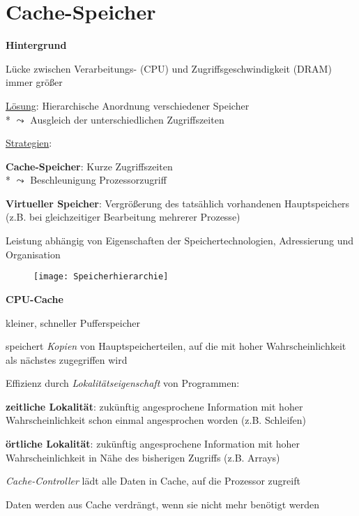 \section{Cache-Speicher}

\textbf{Hintergrund}
\begin{items}
	\item Lücke zwischen Verarbeitungs- (CPU) und Zugriffsgeschwindigkeit (DRAM) immer größer
	\item \underline{Lösung}: Hierarchische Anordnung verschiedener Speicher \\*
		\( \leadsto \) Ausgleich der unterschiedlichen Zugriffszeiten
	\item \underline{Strategien}:
	\begin{enumeration}
		\item \textbf{Cache-Speicher}: Kurze Zugriffszeiten \\*
			\( \leadsto \) Beschleunigung Prozessorzugriff
		\item \textbf{Virtueller Speicher}: Vergrößerung des tatsählich vorhandenen Hauptspeichers (z.B. bei gleichzeitiger Bearbeitung mehrerer Prozesse)
	\end{enumeration}
	\item Leistung abhängig von Eigenschaften der Speichertechnologien, Adressierung und Organisation
\end{items}
\begin{figure}[H]\centering\label{Speicherhierarchie}\texttt{[image: Speicherhierarchie]}\end{figure}

\newpage

\textbf{CPU-Cache}
\begin{items}
	\item kleiner, schneller Pufferspeicher
	\item speichert \emph{Kopien} von Hauptspeicherteilen, auf die mit hoher Wahrscheinlichkeit als nächstes zugegriffen wird
	\item Effizienz durch \emph{Lokalitätseigenschaft} von Programmen:
	\begin{enumeration}
		\item \textbf{zeitliche Lokalität}: zukünftig angesprochene Information mit hoher Wahrscheinlichkeit schon einmal angesprochen worden (z.B. Schleifen)
		\item \textbf{örtliche Lokalität}: zukünftig angesprochene Information mit hoher Wahrscheinlichkeit in Nähe des bisherigen Zugriffs (z.B. Arrays)
	\end{enumeration}
	\item \emph{Cache-Controller} lädt alle Daten in Cache, auf die Prozessor zugreift
	\item Daten werden aus Cache verdrängt, wenn sie nicht mehr benötigt werden
\end{items}


